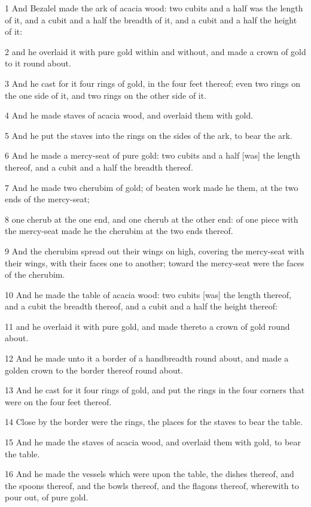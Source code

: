 \par 1 And Bezalel made the ark of acacia wood: two cubits and a half was the length of it, and a cubit and a half the breadth of it, and a cubit and a half the height of it:
\par 2 and he overlaid it with pure gold within and without, and made a crown of gold to it round about.
\par 3 And he cast for it four rings of gold, in the four feet thereof; even two rings on the one side of it, and two rings on the other side of it.
\par 4 And he made staves of acacia wood, and overlaid them with gold.
\par 5 And he put the staves into the rings on the sides of the ark, to bear the ark.
\par 6 And he made a mercy-seat of pure gold: two cubits and a half [was] the length thereof, and a cubit and a half the breadth thereof.
\par 7 And he made two cherubim of gold; of beaten work made he them, at the two ends of the mercy-seat;
\par 8 one cherub at the one end, and one cherub at the other end: of one piece with the mercy-seat made he the cherubim at the two ends thereof.
\par 9 And the cherubim spread out their wings on high, covering the mercy-seat with their wings, with their faces one to another; toward the mercy-seat were the faces of the cherubim.
\par 10 And he made the table of acacia wood: two cubits [was] the length thereof, and a cubit the breadth thereof, and a cubit and a half the height thereof:
\par 11 and he overlaid it with pure gold, and made thereto a crown of gold round about.
\par 12 And he made unto it a border of a handbreadth round about, and made a golden crown to the border thereof round about.
\par 13 And he cast for it four rings of gold, and put the rings in the four corners that were on the four feet thereof.
\par 14 Close by the border were the rings, the places for the staves to bear the table.
\par 15 And he made the staves of acacia wood, and overlaid them with gold, to bear the table.
\par 16 And he made the vessels which were upon the table, the dishes thereof, and the spoons thereof, and the bowls thereof, and the flagons thereof, wherewith to pour out, of pure gold.
